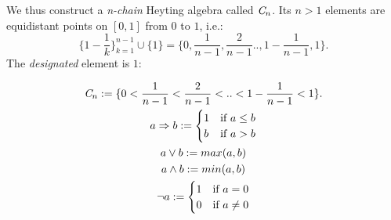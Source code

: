 			We thus construct a \emph{n-chain} Heyting algebra called $\emph{C}_n$. \newline Its $n>1$ elements are equidistant points on $[0,1]$ from $0$ to $1$, i.e.:
			\begin{equation*}
				\{1-\frac{1}{k}\}_{k=1}^{n-1} \cup \{1\}=\{0,\frac{1}{n-1},\frac{2}{n-1}..,1-\frac{1}{n-1},1\}.
			\end{equation*}
			The \emph{designated} element is $1$:
			 \begin{definition}[$\emph{C}_n$]
			 	\begin{gather*}
			 		\emph{C}_n := \{0 < \frac{1}{n-1} < \frac{2}{n-1} <..< 1-\frac{1}{n-1} < 1\}.  \\
			 		a \Rightarrow b :=\begin{cases}
			 			1 & \text{if }a \leq b\\
			 			b &	\text{if }a > b \\
			 		\end{cases}     \\
			 		a \lor b := max(a,b) \\ a \land b := min(a,b) \\
			 		\neg a:=\begin{cases}
			 			1 &	\text{if }a = 0 \\
			 			0 & \text{if }a \neq 0\\
			 		\end{cases}     
			 	\end{gather*}
		 		\end{definition}
	
